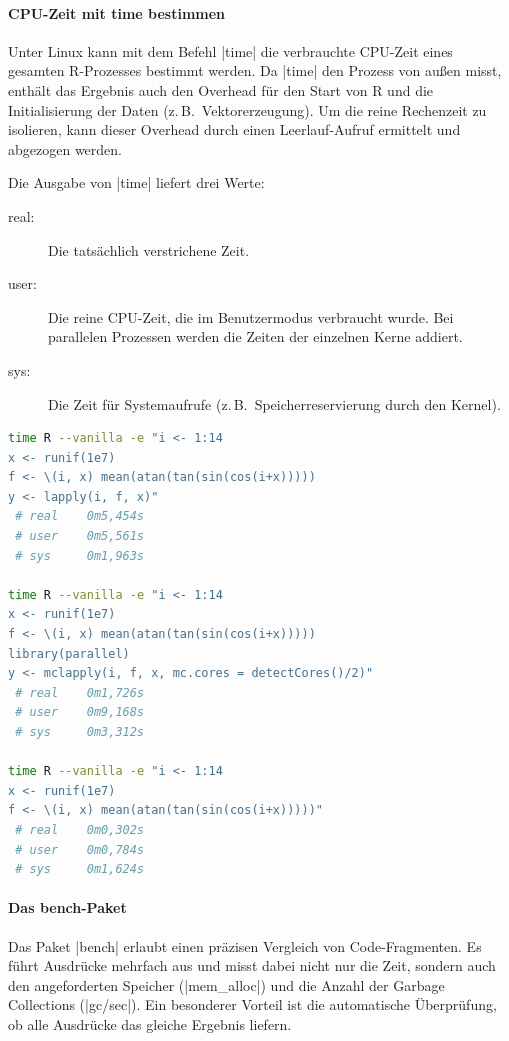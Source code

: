 \documentclass[10pt,twocolumn]{scrartcl}
\renewcommand{\lstinline}{\mycoloredinline}
\begin{document}
\paragraph{CPU-Zeit mit time bestimmen}

Unter Linux kann mit dem Befehl \lstinline|time| die verbrauchte CPU-Zeit eines gesamten R-Prozesses bestimmt werden. Da \lstinline|time| den Prozess von außen misst, enthält das Ergebnis auch den Overhead für den Start von R und die Initialisierung der Daten (z.\,B.\ Vektorerzeugung). Um die reine Rechenzeit zu isolieren, kann dieser Overhead durch einen Leerlauf-Aufruf ermittelt und abgezogen werden.

Die Ausgabe von \lstinline|time| liefert drei Werte:

\begin{description}
\item[real:] Die tatsächlich verstrichene Zeit.
\item[user:] Die reine CPU-Zeit, die im Benutzermodus verbraucht wurde. Bei parallelen Prozessen werden die Zeiten der einzelnen Kerne addiert.
\item[sys:] Die Zeit für Systemaufrufe (z.\,B.\ Speicherreservierung durch den Kernel).
\end{description}

\begin{lstlisting}[language=sh]
time R --vanilla -e "i <- 1:14
x <- runif(1e7)
f <- \(i, x) mean(atan(tan(sin(cos(i+x)))))
y <- lapply(i, f, x)"
 # real    0m5,454s
 # user    0m5,561s
 # sys     0m1,963s
  
time R --vanilla -e "i <- 1:14
x <- runif(1e7)
f <- \(i, x) mean(atan(tan(sin(cos(i+x)))))
library(parallel)
y <- mclapply(i, f, x, mc.cores = detectCores()/2)"
 # real    0m1,726s
 # user    0m9,168s
 # sys     0m3,312s

time R --vanilla -e "i <- 1:14
x <- runif(1e7)
f <- \(i, x) mean(atan(tan(sin(cos(i+x)))))"
 # real    0m0,302s
 # user    0m0,784s
 # sys     0m1,624s
\end{lstlisting}


\paragraph{Das bench-Paket}

Das Paket \lstinline|bench| erlaubt einen präzisen Vergleich von Code-Fragmenten. Es führt Ausdrücke mehrfach aus und misst dabei nicht nur die Zeit, sondern auch den angeforderten Speicher (\lstinline|mem_alloc|) und die Anzahl der Garbage Collections (\lstinline|gc/sec|). Ein besonderer Vorteil ist die automatische Überprüfung, ob alle Ausdrücke das gleiche Ergebnis liefern.
\end{document}
